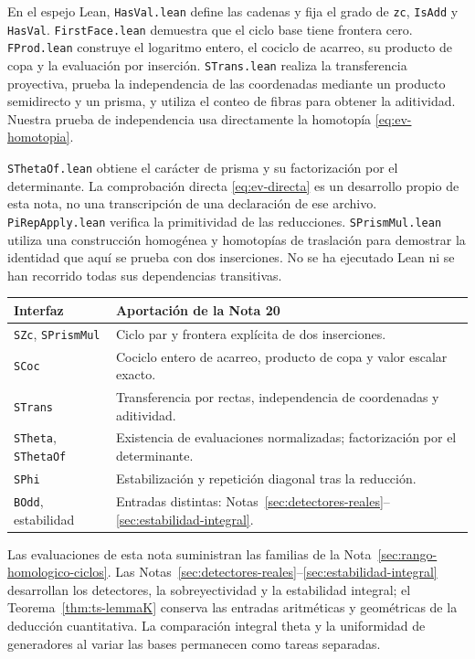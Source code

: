 En el espejo Lean, \texttt{HasVal.lean} define las cadenas y fija el grado de \texttt{zc}, \texttt{IsAdd} y \texttt{HasVal}. \texttt{FirstFace.lean} demuestra que el ciclo base tiene frontera cero. \texttt{FProd.lean} construye el logaritmo entero, el cociclo de acarreo, su producto de copa y la evaluación por inserción. \texttt{STrans.lean} realiza la transferencia proyectiva, prueba la independencia de las coordenadas mediante un producto semidirecto y un prisma, y utiliza el conteo de fibras para obtener la aditividad. Nuestra prueba de independencia usa directamente la homotopía \eqref{eq:ev-homotopia}.

\texttt{SThetaOf.lean} obtiene el carácter de prisma y su factorización por el determinante. La comprobación directa \eqref{eq:ev-directa} es un desarrollo propio de esta nota, no una transcripción de una declaración de ese archivo. \texttt{PiRepApply.lean} verifica la primitividad de las reducciones. \texttt{SPrismMul.lean} utiliza una construcción homogénea y homotopías de traslación para demostrar la identidad que aquí se prueba con dos inserciones. No se ha ejecutado Lean ni se han recorrido todas sus dependencias transitivas.

\begin{center}\small
\begin{tabularx}{\textwidth}{@{}p{}Y@{}}
\toprule
Interfaz & Aportación de la Nota 20\\\midrule
\texttt{SZc}, \texttt{SPrismMul} & Ciclo par y frontera explícita de dos inserciones.\\
\texttt{SCoc} & Cociclo entero de acarreo, producto de copa y valor escalar exacto.\\
\texttt{STrans} & Transferencia por rectas, independencia de coordenadas y aditividad.\\
\texttt{STheta}, \texttt{SThetaOf} & Existencia de evaluaciones normalizadas; factorización por el determinante.\\
\texttt{SPhi} & Estabilización y repetición diagonal tras la reducción.\\
\texttt{BOdd}, estabilidad & Entradas distintas: Notas~\ref{sec:detectores-reales}--\ref{sec:estabilidad-integral}.\\\bottomrule
\end{tabularx}
\end{center}

Las evaluaciones de esta nota suministran las familias de la Nota~\ref{sec:rango-homologico-ciclos}. Las Notas~\ref{sec:detectores-reales}--\ref{sec:estabilidad-integral} desarrollan los detectores, la sobreyectividad y la estabilidad integral; el Teorema~\ref{thm:ts-lemmaK} conserva las entradas aritméticas y geométricas de la deducción cuantitativa. La comparación integral theta y la uniformidad de generadores al variar las bases permanecen como tareas separadas.


